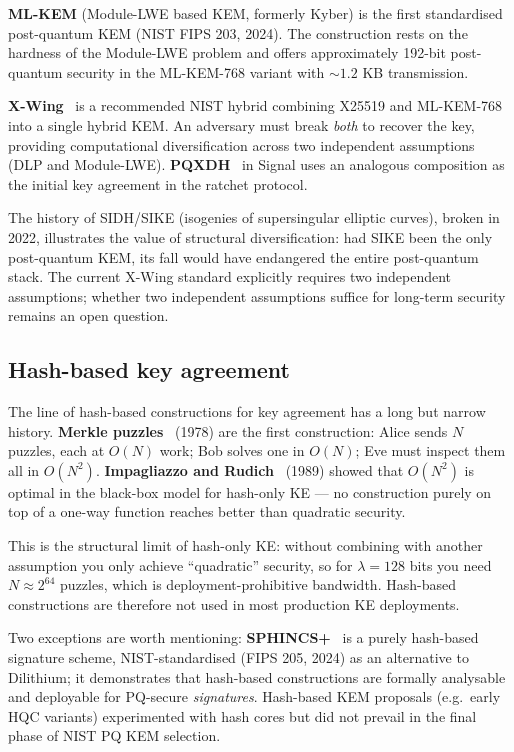 \documentclass[11pt,a4paper]{article}
\begin{document}
\textbf{ML-KEM} (Module-LWE based KEM, formerly Kyber) is the first standardised post-quantum KEM (NIST FIPS 203, 2024). The construction rests on the hardness of the Module-LWE problem and offers approximately 192-bit post-quantum security in the ML-KEM-768 variant with $\sim 1{.}2$ KB transmission.

\textbf{X-Wing}~\cite{xwing} is a recommended NIST hybrid combining X25519 and ML-KEM-768 into a single hybrid KEM. An adversary must break \emph{both} to recover the key, providing computational diversification across two independent assumptions (DLP and Module-LWE). \textbf{PQXDH}~\cite{PQXDH} in Signal uses an analogous composition as the initial key agreement in the ratchet protocol.

The history of SIDH/SIKE (isogenies of supersingular elliptic curves), broken in 2022, illustrates the value of structural diversification: had SIKE been the only post-quantum KEM, its fall would have endangered the entire post-quantum stack. The current X-Wing standard explicitly requires two independent assumptions; whether two independent assumptions suffice for long-term security remains an open question.

\subsection{Hash-based key agreement}\label{sec:related-hash}

The line of hash-based constructions for key agreement has a long but narrow history. \textbf{Merkle puzzles}~\cite{Merkle1978} (1978) are the first construction: Alice sends $N$ puzzles, each at $O(N)$ work; Bob solves one in $O(N)$; Eve must inspect them all in $O(N^2)$. \textbf{Impagliazzo and Rudich}~\cite{IR1989} (1989) showed that $O(N^2)$ is optimal in the black-box model for hash-only KE --- no construction purely on top of a one-way function reaches better than quadratic security.

This is the structural limit of hash-only KE: without combining with another assumption you only achieve ``quadratic'' security, so for $\lambda = 128$ bits you need $N \approx 2^{64}$ puzzles, which is deployment-prohibitive bandwidth. Hash-based constructions are therefore not used in most production KE deployments.

Two exceptions are worth mentioning: \textbf{SPHINCS+}~\cite{SPHINCS+} is a purely hash-based signature scheme, NIST-standardised (FIPS 205, 2024) as an alternative to Dilithium; it demonstrates that hash-based constructions are formally analysable and deployable for PQ-secure \emph{signatures}. Hash-based KEM proposals (e.g.\ early HQC variants) experimented with hash cores but did not prevail in the final phase of NIST PQ KEM selection.
\end{document}
